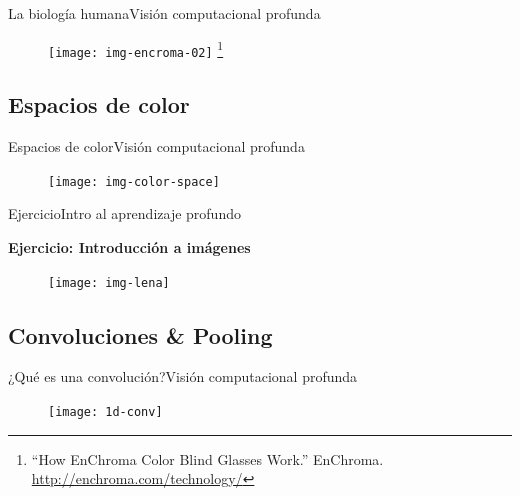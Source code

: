 \documentclass[10pt,border=3pt,tikz]{beamer}
\begin{document}
    \begin{frame}{La biología humana}{Visión computacional profunda}
        \begin{figure}
            \centering
            \texttt{[image: img-encroma-02]}
            \let\thefootnote\relax\footnote{{\tiny “How EnChroma Color Blind Glasses Work.” EnChroma. \url{http://enchroma.com/technology/}}}
        \end{figure}
    \end{frame}
    
    \subsection{Espacios de color}
    \begin{frame}{Espacios de color}{Visión computacional profunda}
        \begin{figure}
            \centering
            \texttt{[image: img-color-space]}
        \end{figure}
    \end{frame}
    
    \begin{frame}{Ejercicio}{Intro al aprendizaje profundo}
        \begin{center}
            {\Large \textbf{Ejercicio: Introducción a imágenes}}
        \end{center}
        \begin{figure}
            \centering
            \texttt{[image: img-lena]}
        \end{figure}
    \end{frame}
    
    \subsection{Convoluciones \& Pooling}
    \begin{frame}{¿Qué es una convolución?}{Visión computacional profunda}
        \begin{figure}
            \centering
            \texttt{[image: 1d-conv]}
        \end{figure}
    \end{frame}
    
\end{document}
